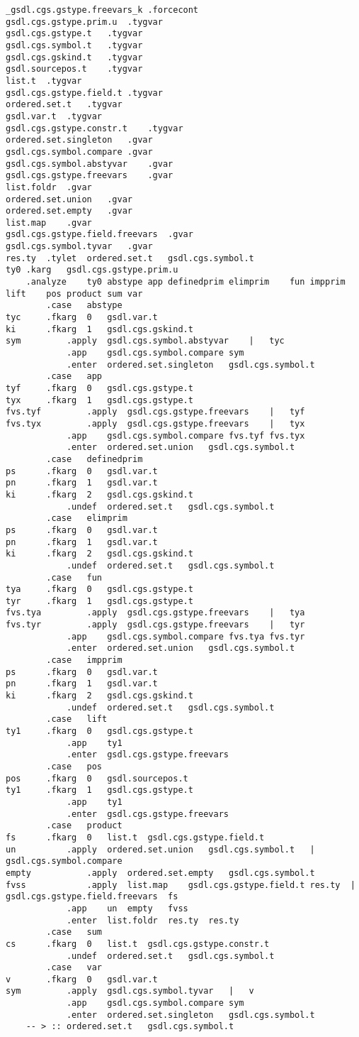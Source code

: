 \documentclass{report}
\begin{document}
\begin{verbatim}
_gsdl.cgs.gstype.freevars_k	.forcecont
gsdl.cgs.gstype.prim.u	.tygvar
gsdl.cgs.gstype.t	.tygvar
gsdl.cgs.symbol.t	.tygvar
gsdl.cgs.gskind.t	.tygvar
gsdl.sourcepos.t	.tygvar
list.t	.tygvar
gsdl.cgs.gstype.field.t	.tygvar
ordered.set.t	.tygvar
gsdl.var.t	.tygvar
gsdl.cgs.gstype.constr.t	.tygvar
ordered.set.singleton	.gvar
gsdl.cgs.symbol.compare	.gvar
gsdl.cgs.symbol.abstyvar	.gvar
gsdl.cgs.gstype.freevars	.gvar
list.foldr	.gvar
ordered.set.union	.gvar
ordered.set.empty	.gvar
list.map	.gvar
gsdl.cgs.gstype.field.freevars	.gvar
gsdl.cgs.symbol.tyvar	.gvar
res.ty	.tylet	ordered.set.t	gsdl.cgs.symbol.t
ty0	.karg	gsdl.cgs.gstype.prim.u
	.analyze	ty0	abstype	app	definedprim	elimprim	fun	impprim	lift	pos	product	sum	var
		.case	abstype
tyc		.fkarg	0	gsdl.var.t
ki		.fkarg	1	gsdl.cgs.gskind.t
sym			.apply	gsdl.cgs.symbol.abstyvar	|	tyc
			.app	gsdl.cgs.symbol.compare	sym
			.enter	ordered.set.singleton	gsdl.cgs.symbol.t
		.case	app
tyf		.fkarg	0	gsdl.cgs.gstype.t
tyx		.fkarg	1	gsdl.cgs.gstype.t
fvs.tyf			.apply	gsdl.cgs.gstype.freevars	|	tyf
fvs.tyx			.apply	gsdl.cgs.gstype.freevars	|	tyx
			.app	gsdl.cgs.symbol.compare	fvs.tyf	fvs.tyx
			.enter	ordered.set.union	gsdl.cgs.symbol.t
		.case	definedprim
ps		.fkarg	0	gsdl.var.t
pn		.fkarg	1	gsdl.var.t
ki		.fkarg	2	gsdl.cgs.gskind.t
			.undef	ordered.set.t	gsdl.cgs.symbol.t
		.case	elimprim
ps		.fkarg	0	gsdl.var.t
pn		.fkarg	1	gsdl.var.t
ki		.fkarg	2	gsdl.cgs.gskind.t
			.undef	ordered.set.t	gsdl.cgs.symbol.t
		.case	fun
tya		.fkarg	0	gsdl.cgs.gstype.t
tyr		.fkarg	1	gsdl.cgs.gstype.t
fvs.tya			.apply	gsdl.cgs.gstype.freevars	|	tya
fvs.tyr			.apply	gsdl.cgs.gstype.freevars	|	tyr
			.app	gsdl.cgs.symbol.compare	fvs.tya	fvs.tyr
			.enter	ordered.set.union	gsdl.cgs.symbol.t
		.case	impprim
ps		.fkarg	0	gsdl.var.t
pn		.fkarg	1	gsdl.var.t
ki		.fkarg	2	gsdl.cgs.gskind.t
			.undef	ordered.set.t	gsdl.cgs.symbol.t
		.case	lift
ty1		.fkarg	0	gsdl.cgs.gstype.t
			.app	ty1
			.enter	gsdl.cgs.gstype.freevars
		.case	pos
pos		.fkarg	0	gsdl.sourcepos.t
ty1		.fkarg	1	gsdl.cgs.gstype.t
			.app	ty1
			.enter	gsdl.cgs.gstype.freevars
		.case	product
fs		.fkarg	0	list.t	gsdl.cgs.gstype.field.t
un			.apply	ordered.set.union	gsdl.cgs.symbol.t	|	gsdl.cgs.symbol.compare
empty			.apply	ordered.set.empty	gsdl.cgs.symbol.t
fvss			.apply	list.map	gsdl.cgs.gstype.field.t	res.ty	|	gsdl.cgs.gstype.field.freevars	fs
			.app	un	empty	fvss
			.enter	list.foldr	res.ty	res.ty
		.case	sum
cs		.fkarg	0	list.t	gsdl.cgs.gstype.constr.t
			.undef	ordered.set.t	gsdl.cgs.symbol.t
		.case	var
v		.fkarg	0	gsdl.var.t
sym			.apply	gsdl.cgs.symbol.tyvar	|	v
			.app	gsdl.cgs.symbol.compare	sym
			.enter	ordered.set.singleton	gsdl.cgs.symbol.t
	-- > :: ordered.set.t	gsdl.cgs.symbol.t


\end{verbatim}
\end{document}
